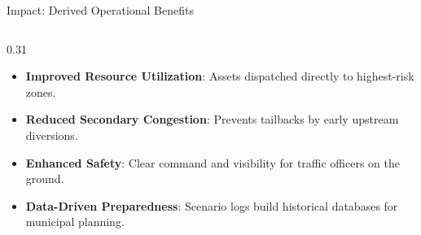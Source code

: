 \documentclass[aspectratio=169,10pt]{beamer}
\begin{document}
\begin{frame}{Impact: Derived Operational Benefits}
\begin{columns}[T]
        \begin{column}{0.31\textwidth}
            \begin{tcolorbox}[dashboardcard, title=PLATFORM BENEFITS, height=0.72\paperheight]
                \color{textwhite}\scriptsize
                \begin{itemize}
                    \item \textbf{Improved Resource Utilization}: Assets dispatched directly to highest-risk zones.
                    \item \textbf{Reduced Secondary Congestion}: Prevents tailbacks by early upstream diversions.
                    \item \textbf{Enhanced Safety}: Clear command and visibility for traffic officers on the ground.
                    \item \textbf{Data-Driven Preparedness}: Scenario logs build historical databases for municipal planning.
                \end{itemize}
            \end{tcolorbox}
        \end{column}
    \end{columns}
\end{frame}
\end{document}
